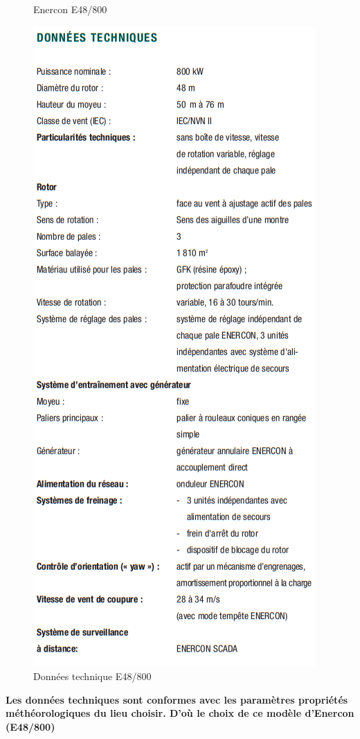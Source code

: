 \documentclass[12pt]{article}
\begin{document}
\begin{itemize}[label=$\color{blue}\clubsuit$]
\begin{figure}[H]
	\caption{Enercon E48/800}
	\label{fig:enercon_e48}
\end{figure}
	\begin{figure}[H]
		\centering
		\includegraphics[width=0.6\linewidth]{../graphique/donnee_technique_e48}
		\caption{Données technique E48/800}
		\label{fig:donnee_technique_e48}
	\end{figure}
	\textbf{Les données techniques sont conformes avec les paramètres propriétés méthéorologiques du lieu choisir. D'où le choix de ce modèle d'Enercon (E48/800)}
	\begin{figure}[H]
		\centering

\end{figure}
\end{itemize}
\end{document}
